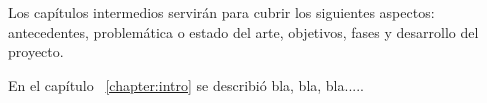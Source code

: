 

Los capítulos intermedios servirán para cubrir los siguientes aspectos:
antecedentes, problemática o estado del arte, objetivos, fases y desarrollo del proyecto.



En el capítulo ~\ref{chapter:intro} se describió bla, bla, bla.....


